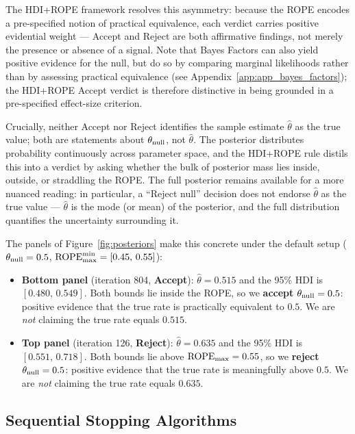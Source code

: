 The HDI+ROPE framework resolves this asymmetry: because the ROPE encodes a pre-specified
notion of practical equivalence, each verdict carries positive evidential weight ---
Accept and Reject are both affirmative findings, not merely the presence or absence of a
signal. Note that Bayes Factors can also yield positive evidence for the null, but do so
by comparing marginal likelihoods rather than by assessing practical equivalence
(see Appendix~\ref{app:app_bayes_factors}); the HDI+ROPE Accept verdict is therefore
distinctive in being grounded in a pre-specified effect-size criterion.

Crucially, neither Accept nor Reject identifies the sample estimate $\hat\theta$ as the
true value; both are statements about $\theta_{\rm null}$, not $\hat\theta$. The posterior
distributes probability continuously across parameter space, and the HDI+ROPE rule distils
this into a verdict by asking whether the bulk of posterior mass lies inside, outside, or
straddling the ROPE. The full posterior remains available for a more nuanced reading: in
particular, a ``Reject null'' decision does not endorse $\hat\theta$ as the true value
--- $\hat\theta$ is the mode (or mean) of the posterior, and the full distribution
quantifies the uncertainty surrounding it.

The panels of Figure~\ref{fig:posteriors} make this concrete under the default setup
($\theta_{\rm null}=0.5$, $\mathrm{ROPE}_{\rm max}^{\rm min}=[0.45,\,0.55]$):

\begin{itemize}
  \item \textbf{Bottom panel} (iteration 804, \textbf{Accept}):
        $\hat\theta=0.515$ and the 95\% HDI is
        $[0.480,\,0.549]$.
        Both bounds lie inside the ROPE, so we \textbf{accept}
        $\theta_{\rm null}=0.5$: positive evidence that the true rate is practically
        equivalent to $0.5$. We are \textit{not} claiming the true rate equals $0.515$.
  \item \textbf{Top panel} (iteration 126, \textbf{Reject}):
        $\hat\theta=0.635$ and the 95\% HDI is
        $[0.551,\,0.718]$.
        Both bounds lie above $\mathrm{ROPE}_{\rm max}=0.55$, so we \textbf{reject}
        $\theta_{\rm null}=0.5$: positive evidence that the true rate is meaningfully
        above $0.5$. We are \textit{not} claiming the true rate equals $0.635$.
\end{itemize}

\subsection{Sequential Stopping Algorithms}\label{sec:sequential_stopping_algorithms}

